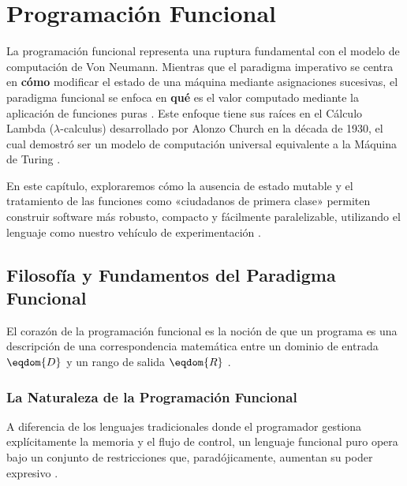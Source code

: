 \chapter{Programación Funcional}
\label{ch:programacion_funcional}

La programación funcional representa una ruptura fundamental con el modelo de computación de Von Neumann. Mientras que el paradigma imperativo se centra en \textbf{cómo} modificar el estado de una máquina mediante asignaciones sucesivas, el paradigma funcional se enfoca en \textbf{qué} es el valor computado mediante la aplicación de funciones puras \cite{SICP}. Este enfoque tiene sus raíces en el Cálculo Lambda ($\lambda$-calculus) desarrollado por Alonzo Church en la década de 1930, el cual demostró ser un modelo de computación universal equivalente a la Máquina de Turing \cite{PFPL, TAPL}.

En este capítulo, exploraremos cómo la ausencia de estado mutable y el tratamiento de las funciones como «ciudadanos de primera clase» permiten construir software más robusto, compacto y fácilmente paralelizable, utilizando el lenguaje  como nuestro vehículo de experimentación \cite{HtDP, SICP}.

\section{Filosofía y Fundamentos del Paradigma Funcional}
\label{sec:4_1_filosofia}

El corazón de la programación funcional es la noción de que un programa es una descripción de una correspondencia matemática entre un dominio de entrada $\eqdom{D}$ y un rango de salida $\eqdom{R}$ \cite{PFPL}.

\subsection{La Naturaleza de la Programación Funcional}
\label{subsec:4_1_1_naturaleza}

A diferencia de los lenguajes tradicionales donde el programador gestiona explícitamente la memoria y el flujo de control, un lenguaje funcional puro opera bajo un conjunto de restricciones que, paradójicamente, aumentan su poder expresivo \cite{HtDP, SICP}.

